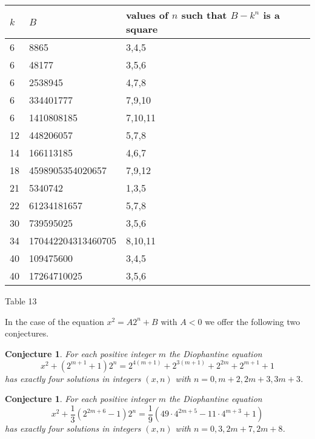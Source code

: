 \documentclass[10pt]{amsart}
\theoremstyle{plain}
\newtheorem{conj}[thm]{Conjecture}
\begin{document}
\begin{center}
\begin{tabular}{|l|l|l|}
  \hline
  
  $k$ & $B$ & values of $n$ such that $B-k^{n}$ is a square \\
   \hline
  6 & 8865               & 3,4,5 \\
  6 & 48177              & 3,5,6 \\
  6 & 2538945            & 4,7,8 \\
  6 & 334401777          & 7,9,10 \\
  6 & 1410808185         & 7,10,11 \\
  12& 448206057          & 5,7,8\\
  14& 166113185          & 4,6,7\\
  18& 4598905354020657   & 7,9,12\\
  21& 5340742            & 1,3,5\\
  22& 61234181657        & 5,7,8\\
  30& 739595025          & 3,5,6\\
  34& 170442204313460705 & 8,10,11\\
  40& 109475600          & 3,4,5\\
  40& 17264710025        & 3,5,6\\
  \hline
\end{tabular}
\end{center}
\begin{center}Table 13\end{center}

In the case of the equation $x^2=A2^{n}+B$ with $A<0$ we offer the following two conjectures.
\begin{conj}
For each positive integer $m$ the Diophantine equation
\begin{equation*}
x^2+(2^{m+1}+1)2^n=2^{4 (m+1)}+2^{3(m+1)}+2^{2 m}+2^{m+1}+1
\end{equation*}
has exactly four solutions in integers $(x,n)$ with $n=0, m+2, 2m+3, 3m+3$.
\end{conj}

\begin{conj}
For each positive integer $m$ the Diophantine equation
\begin{equation*}
x^2+\frac{1}{3}(2^{2m+6}-1)2^n=\frac{1}{9} \left(49\cdot 4^{2 m+5}-11\cdot 4^{m+3}+1\right)
\end{equation*}
has exactly four solutions in integers $(x,n)$ with $n=0, 3, 2m+7, 2m+8$.
\end{conj}
\end{document}
